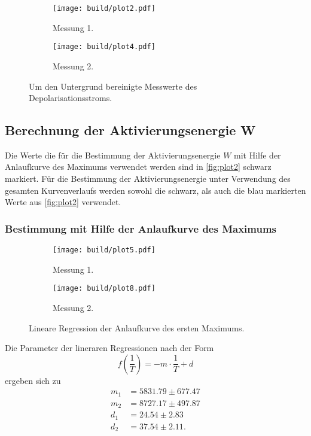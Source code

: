 \begin{figure}[H]
  \begin{subfigure}{\textwidth}
  \centering
  \texttt{[image: build/plot2.pdf]}
  \caption{Messung 1.}
  \label{fig:plot2a}
  \end{subfigure}
  \hfill
  \begin{subfigure}{\textwidth}
  \centering
  \texttt{[image: build/plot4.pdf]}
  \caption{Messung 2.}
  \label{fig:plot2b}
  \end{subfigure}
  \caption{Um den Untergrund bereinigte Messwerte des Depolarisationsstroms.}
  \label{fig:plot2}
\end{figure}



\subsection{Berechnung der Aktivierungsenergie W}
\label{subsec:Aktivierungsenergie}

Die Werte die für die Bestimmung der Aktivierungsenergie $W$ mit Hilfe der Anlaufkurve des Maximums verwendet werden sind in \autoref{fig:plot2}
schwarz markiert.
Für die Bestimmung der Aktivierungsenergie unter Verwendung des gesamten Kurvenverlaufs werden sowohl die schwarz, als auch die blau
markierten Werte aus \autoref{fig:plot2} verwendet.

\subsubsection{Bestimmung mit Hilfe der Anlaufkurve des Maximums}

\begin{figure}[H]
  \begin{subfigure}{\textwidth}
  \centering
  \texttt{[image: build/plot5.pdf]}
  \caption{Messung 1.}
  \label{fig:plot3a}
  \end{subfigure}
  \hfill
  \begin{subfigure}{\textwidth}
  \centering
  \texttt{[image: build/plot8.pdf]}
  \caption{Messung 2.}
  \label{fig:plot3b}
  \end{subfigure}
  \caption{Lineare Regression der Anlaufkurve des ersten Maximums.}
  \label{fig:plot3}
\end{figure}



Die Parameter der lineraren Regressionen nach der Form
\begin{equation}
  f(\frac{1}{T})= -m\cdot \frac{1}{T} +d
\end{equation}
ergeben sich zu
\begin{align*}
  m_1 &= 5831.79 \pm 677.47 \\
  m_2 &= 8727.17 \pm 497.87\\
  d_1 &= 24.54 \pm 2.83\\
  d_2 &= 37.54 \pm 2.11.\\
\end{align*}

